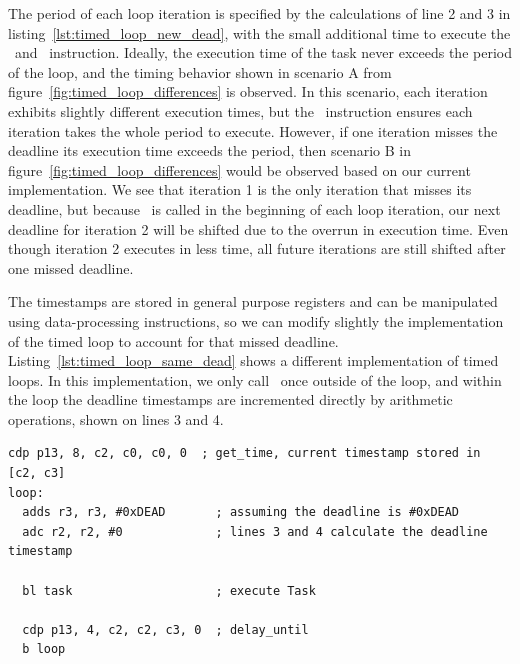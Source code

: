 The period of each loop iteration is specified by the calculations of line 2 and 3 in listing~\ref{lst:timed_loop_new_dead}, with the small additional time to execute the \gettime\ and \delayuntil\ instruction. 
Ideally, the execution time of the task never exceeds the period of the loop, and the timing behavior shown in scenario A from figure~\ref{fig:timed_loop_differences} is observed. 
In this scenario, each iteration exhibits slightly different execution times, but the \delayuntil\ instruction ensures each iteration takes the whole period to execute.
However, if one iteration misses the deadline its execution time exceeds the period, then scenario B in figure~\ref{fig:timed_loop_differences} would be observed based on our current implementation.
We see that iteration 1 is the only iteration that misses its deadline, but because \gettime\ is called in the beginning of each loop iteration, our next deadline for iteration 2 will be shifted due to the overrun in execution time. 
Even though iteration 2 executes in less time, all future iterations are still shifted after one missed deadline.

The timestamps are stored in general purpose registers and can be manipulated using data-processing instructions, so we can modify slightly the implementation of the timed loop to account for that missed deadline. 
Listing~\ref{lst:timed_loop_same_dead} shows a different implementation of timed loops.
In this implementation, we only call \gettime\ once outside of the loop, and within the loop the deadline timestamps are incremented directly by arithmetic operations, shown on lines 3 and 4.    
\vspace{-4mm}
\begin{lstlisting}[float=h, label=lst:timed_loop_same_dead,caption=Timed loops with get\_time outside of the loop ]
  cdp p13, 8, c2, c0, c0, 0  ; get_time, current timestamp stored in [c2, c3]
loop:
  adds r3, r3, #0xDEAD       ; assuming the deadline is #0xDEAD
  adc r2, r2, #0             ; lines 3 and 4 calculate the deadline timestamp
   
  bl task                    ; execute Task
  
  cdp p13, 4, c2, c2, c3, 0  ; delay_until 
  b loop
\end{lstlisting}
\vspace{-2mm}

